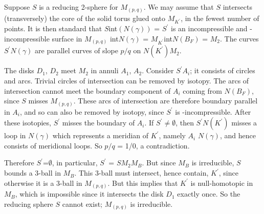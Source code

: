\ssk

Suppose $S$ is a reducing 2-sphere for $M_{(p,q)}$. We may assume 
that $S$ intersects (transversely) the core \gamsp of the solid torus 
glued onto $M_{K^\prime}$, in the fewest number of points. It is then 
standard that $S$\smin int$(N(\gamma))$ = $S^\prime$ is an 
incompressible and \del-incompressible surface in $M_{(p,q)}$\smin 
int$N(\gamma)$ = $M_{K^\prime}$\smin int$N(B_F)$ = $M_2$. The curves 
$S^\prime$\ap\del$N(\gamma)$ are parallel curves of slope $p/q$ on 
\del$N(K^\prime)$\sset\del$M_2$.

The disks $D_1$, $D_2$ meet $M_2$ in annuli $A_1$, $A_2$. Consider 
$S^\prime$\ap$A_i$; it consists of circles and arcs. Trivial circles 
of intersection can be removed by isotopy. The arcs of intersection 
cannot meet the boundary component of $A_i$ coming from \delh 
$N(B_F)$, since $S$ misses \del $M_{(p,q)}$. These arcs of 
intersection are therefore boundary parallel in $A_i$, and so can 
also be removed by isotopy, since $S^\prime$ is \del-incompressible. 
After these isotopies, $S^\prime$ misses the boundary of $A_i$. If 
\del$S^\prime\neq\emptyset$,  then 
\del$S^\prime$\sset\del$N(K^\prime)$ misses a loop in \del$N(\gamma)$ 
which represents a meridian of $K^\prime$, namely $A_i$\ap\del 
$N(\gamma)$, and hence consists of meridional loops. So $p/q$ = 1/0, 
a contradiction.

Therefore \del$S^\prime$=$\emptyset$, in particular, $S^\prime$ = 
$S$\sset$M_2$\sset$M_B$. But since $M_B$ is irreducible, $S$ bounds a 
3-ball in $M_B$. This 3-ball must intersect, hence contain, 
$K^\prime$, since otherwise it is a 3-ball in $M_{(p,q)}$. But this 
implies that $K^\prime$ is null-homotopic in $M_B$, which is 
impossible since it intersects the disk $D_1$ exactly once. So the 
reducing sphere $S$ cannot exist; $M_{(p,q)}$ is irreducible.


\vglue 12pt
\vglue 5pt


\leavevmode

\epsfxsize=4.5in
\centerline{{}}


\msk

